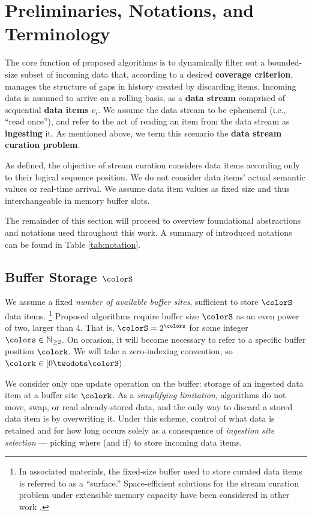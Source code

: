 \section{Preliminaries, Notations, and Terminology} \label{sec:notation}

The core function of proposed algorithms is to dynamically filter out a bounded-size subset of incoming data that, according to a desired \textbf{coverage criterion}, manages the structure of gaps in history created by discarding items.
Incoming data is assumed to arrive on a rolling basis, as a \textbf{data stream} comprised of sequential \textbf{data items} $v_i$.
We assume the data stream to be ephemeral (i.e., ``read once''), and refer to the act of reading an item from the data stream as \textbf{ingesting} it.
As mentioned above, we term this scenario the \textbf{data stream curation problem}.

As defined, the objective of stream curation considers data items according only to their logical sequence position.
We do not consider data items' actual semantic values or real-time arrival.
We assume data item values as fixed size and thus interchangeable in memory buffer slots.

The remainder of this section will proceed to overview foundational abstractions and notations used throughout this work.
A summary of introduced notations can be found in Table \ref{tab:notation}.



\subsection{Buffer Storage $\colorS$}
\label{sec:notation-buffer}

We assume a fixed \textit{number of available buffer sites}, sufficient to store $\colorS$ data items.%
\footnote{%
In associated materials, the fixed-size buffer used to store curated data items is referred to as a ``surface.''
Space-efficient solutions for the stream curation problem under extensible memory capacity have been considered in other work \citep{moreno2024algorithms}.%
}
Proposed algorithms require buffer size $\colorS$ as an even power of two, larger than 4. That is, $\colorS = 2^{\colors}$ for some integer $\colors \in \mathbb{N}_{\geq 2}$.
On occasion, it will become necessary to refer to a specific buffer position $\colork$.
We will take a zero-indexing convention, so $\colork \in [0\twodots\colorS)$.

We consider only one update operation on the buffer: storage of an ingested data item at a buffer site $\colork$.
As a \textit{simplifying limitation}, algorithms do not move, swap, or read already-stored data, and the only way to discard a stored data item is by overwriting it.
Under this scheme, control of what data is retained and for how long occurs solely as a consequence of \textit{ingestion site selection} --- picking where (and if) to store incoming data items.

